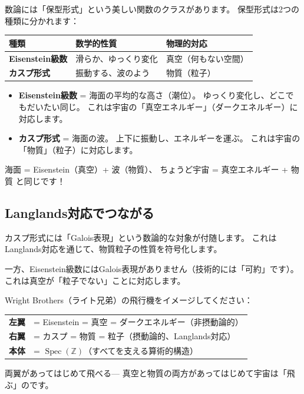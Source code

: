 \documentclass[12pt,a4paper]{article}
\newcommand{\Spec}{\operatorname{Spec}}
\begin{document}
数論には「保型形式」という美しい関数のクラスがあります。
保型形式は2つの種類に分かれます：

\begin{center}
\begin{tabular}{lll}
\toprule
種類 & 数学的性質 & 物理的対応 \\
\midrule
\textbf{Eisenstein級数} & 滑らか、ゆっくり変化 & 真空（何もない空間） \\
\textbf{カスプ形式} & 振動する、波のよう & 物質（粒子） \\
\bottomrule
\end{tabular}
\end{center}

\begin{analogy}[海のアナロジー]
\begin{itemize}
  \item \textbf{Eisenstein級数} = 海面の平均的な高さ（潮位）。
    ゆっくり変化し、どこでもだいたい同じ。
    これは宇宙の「真空エネルギー」（ダークエネルギー）に対応します。
  \item \textbf{カスプ形式} = 海面の波。
    上下に振動し、エネルギーを運ぶ。
    これは宇宙の「物質」（粒子）に対応します。
\end{itemize}

海面 = Eisenstein（真空）+ 波（物質）、
ちょうど宇宙 = 真空エネルギー + 物質 と同じです！
\end{analogy}

\subsection{Langlands対応でつながる}

カスプ形式には「Galois表現」という数論的な対象が付随します。
これはLanglands対応を通じて、物質粒子の性質を符号化します。

一方、Eisenstein級数にはGalois表現がありません（技術的には「可約」です）。
これは真空が「粒子でない」ことに対応します。

\begin{mathbox}
Wright Brothers（ライト兄弟）の飛行機をイメージしてください：

\begin{center}
\begin{tabular}{ll}
\textbf{左翼} & = Eisenstein = 真空 = ダークエネルギー（非摂動論的） \\
\textbf{右翼} & = カスプ = 物質 = 粒子（摂動論的、Langlands対応） \\
\textbf{本体} & = $\Spec(\mathbb{Z})$（すべてを支える算術的構造） \\
\end{tabular}
\end{center}

両翼があってはじめて飛べる---
真空と物質の両方があってはじめて宇宙は「飛ぶ」のです。
\end{mathbox}
\end{document}
